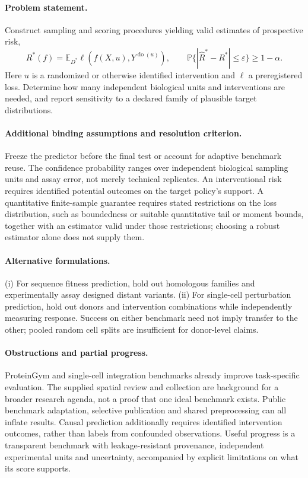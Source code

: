 \documentclass[11pt]{article}
\begin{document}
\paragraph{Problem statement.} Construct sampling and scoring procedures yielding valid estimates of prospective risk,
\[R^*(f)=\mathbb{E}_{D^*}\ell(f(X,u),Y^{\operatorname{do}(u)}),\qquad \mathbb{P}\{|\widehat R^*-R^*|\le\varepsilon\}\ge1-\alpha.\]
Here $u$ is a randomized or otherwise identified intervention and $\ell$ a preregistered loss. Determine how many independent biological units and interventions are needed, and report sensitivity to a declared family of plausible target distributions.
\paragraph{Additional binding assumptions and resolution criterion.} Freeze the predictor before the final test or account for adaptive benchmark reuse. The confidence probability ranges over independent biological sampling units and assay error, not merely technical replicates. An interventional risk requires identified potential outcomes on the target policy's support. A quantitative finite-sample guarantee requires stated restrictions on the loss distribution, such as boundedness or suitable quantitative tail or moment bounds, together with an estimator valid under those restrictions; choosing a robust estimator alone does not supply them.

\paragraph{Alternative formulations.} (i) For sequence fitness prediction, hold out homologous families and experimentally assay designed distant variants. (ii) For single-cell perturbation prediction, hold out donors and intervention combinations while independently measuring response. Success on either benchmark need not imply transfer to the other; pooled random cell splits are insufficient for donor-level claims.
\paragraph{Obstructions and partial progress.} ProteinGym and single-cell integration benchmarks already improve task-specific evaluation. The supplied spatial review and collection are background for a broader research agenda, not a proof that one ideal benchmark exists. Public benchmark adaptation, selective publication and shared preprocessing can all inflate results. Causal prediction additionally requires identified intervention outcomes, rather than labels from confounded observations. Useful progress is a transparent benchmark with leakage-resistant provenance, independent experimental units and uncertainty, accompanied by explicit limitations on what its score supports.
\end{document}
